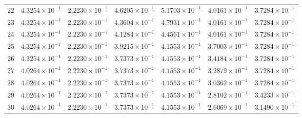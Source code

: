 \begin{table}[H]
\begin{tabular}{@{}rrrrrrr@{}}
22 & $4.3254\times10^{-1}$ & $2.2230\times10^{-1}$ & $4.6205\times10^{-1}$ & $5.1703\times10^{-1}$ & $4.0161\times10^{-1}$ & $3.7284\times10^{-1}$\\
23 & $4.3254\times10^{-1}$ & $2.2230\times10^{-1}$ & $4.3604\times10^{-1}$ & $4.7931\times10^{-1}$ & $4.0161\times10^{-1}$ & $3.7284\times10^{-1}$\\
24 & $4.3254\times10^{-1}$ & $2.2230\times10^{-1}$ & $4.1284\times10^{-1}$ & $4.4561\times10^{-1}$ & $4.0161\times10^{-1}$ & $3.7284\times10^{-1}$\\
25 & $4.3254\times10^{-1}$ & $2.2230\times10^{-1}$ & $3.9215\times10^{-1}$ & $4.1553\times10^{-1}$ & $3.7003\times10^{-1}$ & $3.7284\times10^{-1}$\\
26 & $4.3254\times10^{-1}$ & $2.2230\times10^{-1}$ & $3.7373\times10^{-1}$ & $4.1553\times10^{-1}$ & $3.4184\times10^{-1}$ & $3.7284\times10^{-1}$\\
27 & $4.0264\times10^{-1}$ & $2.2230\times10^{-1}$ & $3.7373\times10^{-1}$ & $4.1553\times10^{-1}$ & $3.2879\times10^{-1}$ & $3.7284\times10^{-1}$\\
28 & $4.0264\times10^{-1}$ & $2.2230\times10^{-1}$ & $3.7373\times10^{-1}$ & $4.1553\times10^{-1}$ & $3.0362\times10^{-1}$ & $3.7284\times10^{-1}$\\
29 & $4.0264\times10^{-1}$ & $2.2230\times10^{-1}$ & $3.7373\times10^{-1}$ & $4.1553\times10^{-1}$ & $2.8102\times10^{-1}$ & $3.4233\times10^{-1}$\\
30 & $4.0264\times10^{-1}$ & $2.2230\times10^{-1}$ & $3.7373\times10^{-1}$ & $4.1553\times10^{-1}$ & $2.6069\times10^{-1}$ & $3.1490\times10^{-1}$\\
\bottomrule
\end{tabular}
\end{table}

